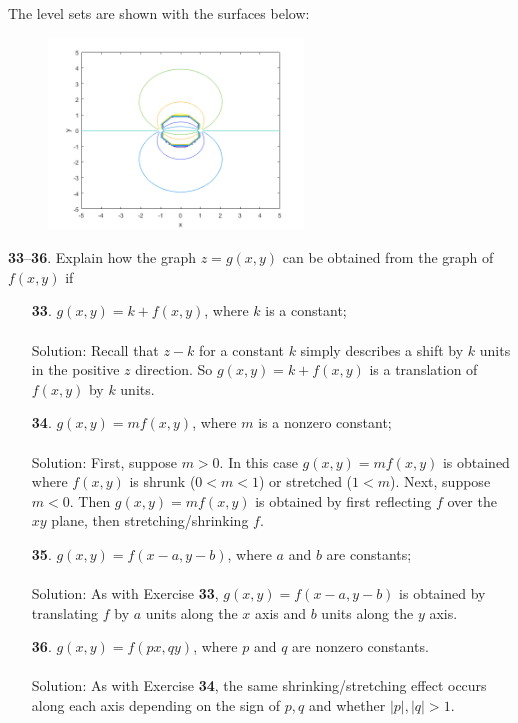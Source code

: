 \documentclass[12pt]{amsbook}
\begin{document}
\begin{enumerate}
   The level sets are shown with the surfaces below:
  \begin{center}
  \includegraphics[width=3.5in,height=2.0in]{3_1_32.png}
  \end{center}
\end{enumerate}

\noindent
{\small {\bf 33}--{\bf 36}}. Explain how the graph $z = g(x, y)$ can be obtained from the graph
of $f(x, y)$ if
\begin{enumerate}
  \item[{\small\bf 33}.] $g(x,y)=k+f(x,y)$, where $k$ is a constant;
  \\
  \\
  {\sc Solution}: Recall that $z-k$ for a constant $k$ simply describes a shift by $k$ units in the positive $z$ direction. So $g(x,y)=k+f(x,y)$ is a translation of $f(x,y)$ by $k$ units.
  \\
  \item[{\small\bf 34}.] $g(x,y)=mf(x,y)$, where $m$ is a nonzero constant;
  \\
  \\
  {\sc Solution}: First, suppose $m>0$. In this case $g(x,y)=mf(x,y)$ is obtained where $f(x,y)$ is shrunk ($0<m<1$) or stretched ($1<m$). Next, suppose $m<0$. Then $g(x,y)=mf(x,y)$ is obtained by first reflecting $f$ over the $xy$ plane, then stretching/shrinking $f$.
  \\
  \item[{\small\bf 35}.] $g(x,y)=f(x-a,y-b)$, where $a$ and $b$ are constants;
  \\
  \\
  {\sc Solution}: As with Exercise {\bf 33}, $g(x,y)=f(x-a,y-b)$ is obtained by translating $f$ by $a$ units along the $x$ axis and $b$ units along the $y$ axis.
  \\
  \item[{\small\bf 36}.] $g(x,y)=f(px,qy)$, where $p$ and $q$ are nonzero constants.
  \\
  \\
  {\sc Solution}: As with Exercise {\bf 34}, the same shrinking/stretching effect occurs along each axis depending on the sign of $p,q$ and whether $|p|,|q|>1$.
  \\
\end{enumerate}
\end{document}
